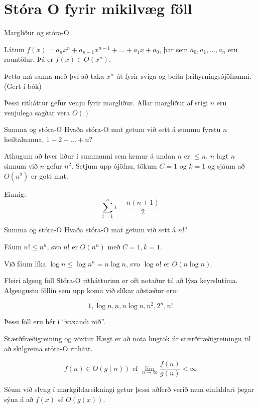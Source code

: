\documentclass[handout]{beamer}
\begin{document}
\section{Stóra O fyrir mikilvæg föll}

\begin{frame}{Margliður og stóra-O}
\begin{tcolorbox}[title=Margliður og stóra O]
Látum $f(x) = a_n x^n + a_{n-1}x^{n-1} + \ldots + a_1x + a_0$, þar sem $a_0, a_1, \ldots, a_n$ eru rauntölur. Þá er $f(x) \in O(x^n)$.
\end{tcolorbox}
Þetta má sanna með því að taka $x^n$ út fyrir sviga og beita þríhyrningsójöfnunni. (Gert í bók)

Þessi ritháttur gefur venju fyrir margliður. Allar margliður af stigi $n$ eru venjulega sagðar vera $O()$
\end{frame}

\begin{frame}{Summa og stóra-O}
Hvaða stóra-O mat getum við sett á summu fyrstu $n$ heiltalnanna, $1 + 2 + \ldots + n$? \pause

Athugum að hver liður í summunni sem kemur á undan $n$ er $\leq n$. $n$ lagt $n$ sinnum við $n$ gefur $n^2$. Setjum upp ójöfnu, tökum $C = 1$ og $k = 1$ og sjáum að $O(n^2)$ er gott mat.

Einnig:
\[
 \sum_{i=1}^n i = \frac{n(n+1)}{2}
\]

\end{frame}

\begin{frame}{Summa og stóra-O}
Hvaða stóra-O mat getum við sett á $n!$? \pause

Fáum $n! \leq n^n$, svo $n!$ er $O(n^n)$ með $C=1, k=1$. 

Við fáum líka $\log n \leq \log n^n = n \log n$, svo $\log n!$ er $O(n \log n)$. 
\end{frame}

\begin{frame}{Fleiri algeng föll}
Stóra-O rithátturinn er oft notaður til að lýsa keyrslutíma. Algengustu föllin sem upp koma við slíkar aðstæður eru:

\[
 1, \log n, n, n \log n, n^2 , 2^n , n!
\]

Þessi föll eru hér í ``vaxandi röð''.
\end{frame}

\begin{frame}{Stærðfræðigreining og vöxtur}
Hægt er að nota hugtök úr stærðfræðigreiningu til að skilgreina stóra-O rithátt.

\[
  f(n) \in O(g(n)) \text{ ef } \lim_{n\to \infty}\frac{f(n)}{g(n)} < \infty
\]

Séum við slyng í markgildareikningi getur þessi aðferð verið mun einfaldari þegar sýna á að $f(x)$ sé $O(g(x))$.
\end{frame}
\end{document}
